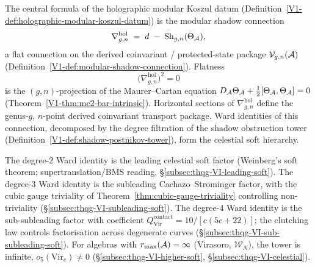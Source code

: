%
%
%
%
%

The central formula of the holographic modular Koszul datum
(Definition~\ref{V1-def:holographic-modular-koszul-datum}) is the modular
shadow connection
\begin{equation}%
\nabla^{\mathrm{hol}}_{g,n}
\;=\;
d \;-\; \Sh_{g,n}(\Theta_\cA),
\end{equation}
a flat connection on the derived coinvariant / protected-state package
$\mathcal{V}_{g,n}(\mathcal{A})$
(Definition~\ref{V1-def:modular-shadow-connection}).
Flatness
\begin{equation}%
\bigl(\nabla^{\mathrm{hol}}_{g,n}\bigr)^2 = 0
\end{equation}
is the $(g,n)$-projection of the Maurer--Cartan equation
$D_{\mathcal{A}}\Theta_{\mathcal{A}} + \tfrac{1}{2}[\Theta_{\mathcal{A}},\Theta_{\mathcal{A}}] = 0$
(Theorem~\ref*{V1-thm:mc2-bar-intrinsic}). Horizontal sections
of $\nabla^{\mathrm{hol}}_{g,n}$ define the genus-$g$,
$n$-point derived coinvariant transport package. Ward
identities of this connection, decomposed by the degree filtration
of the shadow obstruction tower
(Definition~\ref{V1-def:shadow-postnikov-tower}), form the
celestial soft hierarchy.

The degree-$2$ Ward identity is the leading celestial soft factor
(Weinberg's soft theorem; supertranslation/BMS reading,
\S\ref{subsec:thqg-VI-leading-soft}). The degree-$3$ Ward identity
is the subleading Cachazo--Strominger factor, with the cubic gauge
triviality of Theorem~\ref{thm:cubic-gauge-triviality} controlling
non-triviality (\S\ref{subsec:thqg-VI-subleading-soft}). The
degree-$4$ Ward identity is the sub-subleading factor with
coefficient $Q^{\mathrm{contact}}_{\mathrm{Vir}} = 10/[c(5c+22)]$;
the clutching law controls factorisation across degenerate curves
(\S\ref{subsec:thqg-VI-sub-subleading-soft}). For algebras with
$r_{\max}(\mathcal{A}) = \infty$ (Virasoro, $\mathcal{W}_N$), the tower
is infinite, $o_5(\mathrm{Vir}_c) \neq 0$
(\S\ref{subsec:thqg-VI-higher-soft},
\S\ref{subsec:thqg-VI-celestial}).

